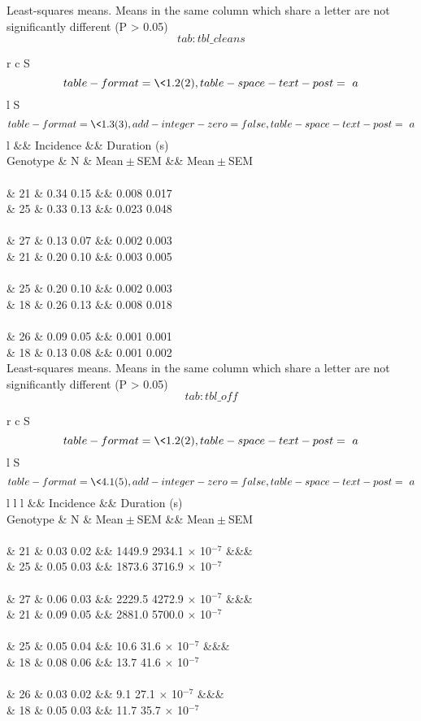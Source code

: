 \documentclass[]{article}
\begin{document}
Least-squares means. Means in the same column which share a letter are
not significantly different (P \textgreater{} 0.05)\\

\protect\hypertarget{tab:tbl_cleans}{}{\[tab:tbl\_cleans\]}

r c S\[table-format= \<1.2(2),table-space-text-post= a\] l
S\[table-format= \<1.3(3), add-integer-zero=false,
table-space-text-post= a\] l \&\& Incidence \&\& Duration (s)\\
Genotype \& N \& Mean\({}\pm{}\)SEM \&\& Mean\({}\pm{}\)SEM\\
~\\
\& 21 \& 0.34 0.15 \&\& 0.008 0.017\\
\& 25 \& 0.33 0.13 \&\& 0.023 0.048\\
~\\
\& 27 \& 0.13 0.07 \&\& 0.002 0.003\\
\& 21 \& 0.20 0.10 \&\& 0.003 0.005\\
~\\
\& 25 \& 0.20 0.10 \&\& 0.002 0.003\\
\& 18 \& 0.26 0.13 \&\& 0.008 0.018\\
~\\
\& 26 \& 0.09 0.05 \&\& 0.001 0.001\\
\& 18 \& 0.13 0.08 \&\& 0.001 0.002\\

Least-squares means. Means in the same column which share a letter are
not significantly different (P \textgreater{} 0.05)\\

\protect\hypertarget{tab:tbl_off}{}{\[tab:tbl\_off\]}

r c S\[table-format= \<1.2(2),table-space-text-post= a\] l
S\[table-format= \<4.1(5), add-integer-zero=false,
table-space-text-post= a\] l l l \&\& Incidence \&\& Duration (s)\\
Genotype \& N \& Mean\({}\pm{}\)SEM \&\& Mean\({}\pm{}\)SEM\\
~\\
\& 21 \& 0.03 0.02 \&\& 1449.9 2934.1 \({\times}\) 10\(^{-7}\) \&\&\&\\
\& 25 \& 0.05 0.03 \&\& 1873.6 3716.9 \({\times}\) 10\(^{-7}\)\\
~\\
\& 27 \& 0.06 0.03 \&\& 2229.5 4272.9 \({\times}\) 10\(^{-7}\) \&\&\&\\
\& 21 \& 0.09 0.05 \&\& 2881.0 5700.0 \({\times}\) 10\(^{-7}\)\\
~\\
\& 25 \& 0.05 0.04 \&\& 10.6 31.6 \({\times}\) 10\(^{-7}\) \&\&\&\\
\& 18 \& 0.08 0.06 \&\& 13.7 41.6 \({\times}\) 10\(^{-7}\)\\
~\\
\& 26 \& 0.03 0.02 \&\& 9.1 27.1 \({\times}\) 10\(^{-7}\) \&\&\&\\
\& 18 \& 0.05 0.03 \&\& 11.7 35.7 \({\times}\) 10\(^{-7}\)\\
\end{document}
